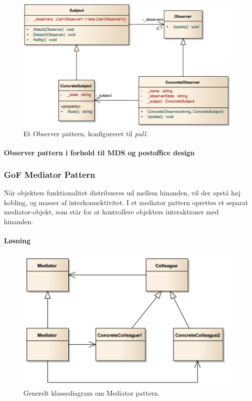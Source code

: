 \begin{figure}[h]
	\centering
	\includegraphics[width=0.8\linewidth]{figs/spm5/observerUML}
	\caption{Et Observer pattern, konfigureret til \textit{pull}.}
	\label{fig:ObserverPattern}
\end{figure}

\paragraph{Observer pattern i forhold til MDS og postoffice design}

\subsubsection{GoF Mediator Pattern}
Når objekters funktionalitet distribueres ud mellem hinanden, vil der opstå høj kobling, og masser af interkonnektivitet.  I et mediator pattern oprettes et separat mediator-objekt, som står for at kontrollere objekters interaktioner med hinanden. 

\paragraph{Løsning}

\begin{figure}[h]
	\centering
	\includegraphics[width=0.8\linewidth]{figs/spm5/concrete}
	\caption{Generelt klassediagram om Mediator pattern.}
	\label{fig:concrete}
\end{figure}


